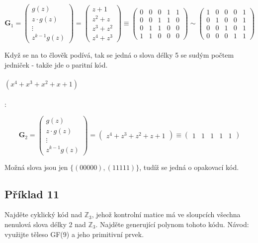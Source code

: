 \documentclass{article}
\begin{document}
\[
\mathbf{G}_1 = \begin{pmatrix}
  g(z) \\
  z\cdot g(z) \\
  \vdots \\
  z^{k-1}g(z)
	\end{pmatrix} = 
	\begin{pmatrix}
  z+1\\
  z^2 + z\\
  z^3 + z^2\\
  z^4 + z^3 
	\end{pmatrix} \equiv
	\begin{pmatrix}
  0 & 0 & 0 & 1 & 1\\
  0 & 0 & 1 & 1 & 0\\
  0 & 1 & 1 & 0 & 0\\
  1 & 1 & 0 & 0 & 0
	\end{pmatrix} \sim 
	\begin{pmatrix}
  1 & 0 & 0 & 0 & 1\\
  0 & 1 & 0 & 0 & 1\\
  0 & 0 & 1 & 0 & 1\\
  0 & 0 & 0 & 1 & 1
	\end{pmatrix}
	\]
	 
	 Když se na to člověk podívá, tak se jedná o slova délky 5 se sudým počtem jedniček - takže jde o paritní kód.
	 
\paragraph {$(x^4 + x^3 + x^2 + x + 1)$}:

\[
\mathbf{G}_2 = \begin{pmatrix}
  g(z) \\
  z\cdot g(z) \\
  \vdots \\
  z^{k-1}g(z)
	\end{pmatrix} = 
	\begin{pmatrix}
  z^4 + z^3 + z^2 + z + 1
 	\end{pmatrix} \equiv
	\begin{pmatrix}
  1 & 1 & 1 & 1 & 1
  \end{pmatrix}
	\]
	 
Možná slova jsou jen $\{(00000),(11111)\}$, tudíž se jedná o opakovací kód.


\subsection{\label{priklad3-11}Příklad 11}
Najděte cyklický kód nad $\mathbb{Z}_3$, jehož kontrolní matice má ve sloupcích všechna nenulová slova délky 2 nad $\mathbb{Z}_3$. Najděte generující polynom tohoto kódu. Návod: využijte těleso GF(9) a jeho primitivní prvek. 
\end{document}
